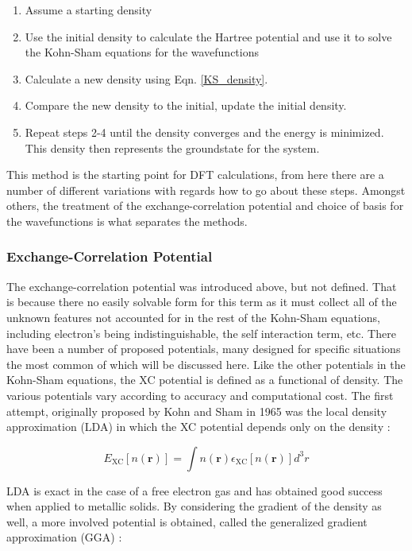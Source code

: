 \begin{enumerate}
	\item Assume a starting density
	\item Use the initial density to calculate the Hartree potential and use it to solve the Kohn-Sham equations for the wavefunctions
	\item Calculate a new density using Eqn. \ref{KS_density}.
	\item Compare the new density to the initial, update the initial density. 
	\item Repeat steps 2-4 until the density converges and the energy is minimized. This density then represents the groundstate for the system.
\end{enumerate}

This method is the starting point for DFT calculations, from here there are a number of different variations with regards how to go about these steps.  Amongst others, the treatment of the exchange-correlation potential and choice of basis for the wavefunctions is what separates the methods.  


\subsubsection{Exchange-Correlation Potential}
The exchange-correlation potential was introduced above, but not defined.  That is because there no easily solvable form for this term as it must collect all of the unknown features not accounted for in the rest of the Kohn-Sham equations, including electron's being indistinguishable, the self interaction term, etc.   There have been a number of proposed potentials, many designed for specific situations the most common of which will be discussed here.  Like the other potentials in the Kohn-Sham equations, the XC potential is defined as a functional of density.  The various potentials vary according to accuracy and computational cost.  The first attempt, originally proposed by Kohn and Sham in 1965 was the local density approximation (LDA) in which the XC potential depends only on the density \cite{tao_climbing_2003, ks_1965}: 

\begin{equation}
	E_{\mathrm{XC}}[n(\textbf{r})] = \int  n(\textbf{r}) \epsilon_{\mathrm{XC}}[n(\textbf{r})] d^3r
\end{equation}

LDA is exact in the case of a free electron gas and has obtained good success when applied to metallic solids.  By considering the gradient of the density as well, a more involved potential is obtained, called the generalized gradient approximation (GGA) \cite{tao_climbing_2003,perdew_wang} : 


